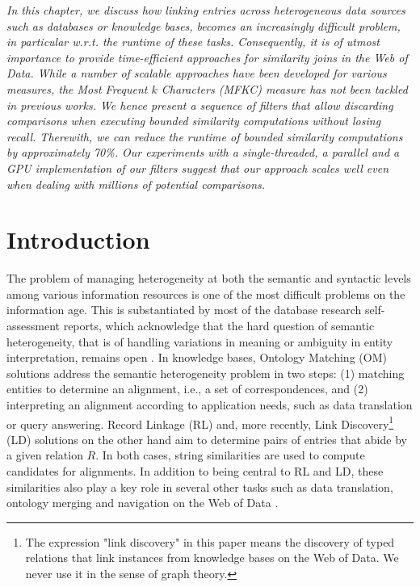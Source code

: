 \textit{In this chapter, we discuss how linking entries across heterogeneous data sources such as databases or knowledge bases, becomes an increasingly difficult problem, in particular w.r.t. the runtime of these tasks. 
Consequently, it is of utmost importance to provide time-efficient approaches for similarity joins in the Web of Data. 
While a number of scalable approaches have been developed for various measures, the Most Frequent $k$ Characters (MFKC) measure has not been tackled in previous works. 
We hence present a sequence of filters that allow discarding comparisons when executing bounded similarity computations without losing recall. 
Therewith, we can reduce the runtime of bounded similarity computations by approximately 70\%.  
Our experiments with a single-threaded, a parallel and a GPU implementation of our filters suggest that our approach scales well even when dealing with millions of potential comparisons.}

\section{Introduction}
The problem of managing heterogeneity at both the semantic and syntactic levels among various information resources \cite{valdestilhasdbpediasameas,shvaiko2013ontology} is one of the most difficult problems on the information age.
This is substantiated by most of the database research self-assessment reports, which acknowledge that the hard question of semantic heterogeneity, that is of handling variations in meaning or ambiguity in entity interpretation, remains open \cite{shvaiko2013ontology}. In knowledge bases, Ontology Matching (OM) solutions address the semantic heterogeneity problem in two steps: (1) matching entities to determine an alignment, i.e., a set of correspondences, and (2) interpreting an alignment according to application needs, such as data translation or query answering. Record Linkage (RL) and, more recently, Link Discovery\footnote{The expression "link discovery" in this paper means the discovery of typed relations that link instances from knowledge bases on the Web of Data. We never use it in the sense of graph theory.} (LD) solutions on the other hand aim to determine pairs of entries that abide by a given relation $R$. In both cases, string similarities are used  to compute candidates for alignments. %
In addition to being central to RL and LD, these similarities also play a key role in several other tasks such as data translation, ontology merging and navigation on the Web of Data \cite{shvaiko2013ontology,euzenat2007ontology}.

